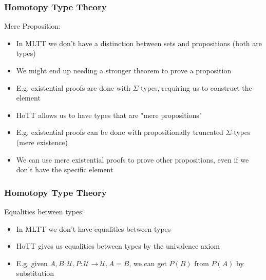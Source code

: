 \documentclass[9pt]{beamer}
\begin{document}
\begin{frame}
\frametitle{Homotopy Type Theory}

Mere Proposition:

\begin{itemize}

  \item In MLTT we don't have a distinction between sets and propositions (both are types)
  \item We might end up needing a stronger theorem to prove a proposition
  \item E.g. existential proofs are done with $\Sigma$-types, requiring us to construct the element
  \item<2-> HoTT allows us to have types that are "mere propositions"
  \item<2-> E.g. existential proofs can be done with propositionally truncated $\Sigma$-types (mere existence)
  \item<2-> We can use mere existential proofs to prove other propositions, even if we don't have the specific element

\end{itemize}

\end{frame}

\begin{frame}
\frametitle{Homotopy Type Theory}
Equalities between types:

\begin{itemize}

  \item In MLTT we don't have equalities between types
  \item HoTT gives us equalities between types by the univalence axiom 
  \item E.g. given $A, B : \mathcal{U}, P : \mathcal{U} \rightarrow \mathcal{U}, A = B$,
        we can get $P(B)$ from $P(A)$ by substitution

\end{itemize}


\end{frame}
\end{document}

